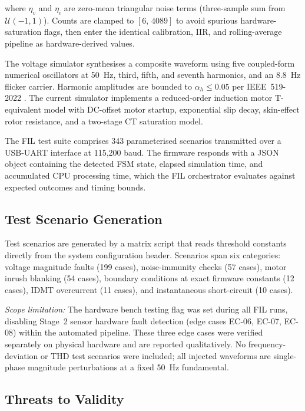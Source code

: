\documentclass[conference]{IEEEtran}
\begin{document}
\noindent
where $\eta_v$ and $\eta_i$ are zero-mean triangular noise terms
(three-sample sum from $\mathcal{U}(-1,1)$).  Counts are clamped to
$[6,\,4089]$ to avoid spurious hardware-saturation flags, then enter
the identical calibration, IIR, and rolling-average pipeline as
hardware-derived values.

The voltage simulator synthesises a composite waveform using five
coupled-form numerical oscillators \cite{oppenheim_dsp} at \SI{50}{\hertz}, third, fifth,
and seventh harmonics, and an \SI{8.8}{\hertz} flicker carrier.
Harmonic amplitudes are bounded to $\alpha_h \leq 0.05$ per
IEEE~519-2022 \cite{ieee519}.  The current simulator implements a
reduced-order induction motor T-equivalent model \cite{ieee112} with
DC-offset motor startup, exponential slip decay, skin-effect rotor
resistance, and a two-stage CT saturation model.

The FIL test suite comprises 343 parameterised scenarios transmitted
over a USB-UART interface at 115{,}200 baud.  The firmware responds
with a JSON object containing the detected FSM state, elapsed
simulation time, and accumulated CPU processing time, which the FIL
orchestrator evaluates against expected outcomes and timing bounds.

\subsection{Test Scenario Generation}

Test scenarios are generated by a matrix script that reads threshold
constants directly from the system configuration header.  Scenarios
span six categories: voltage magnitude faults (199 cases),
noise-immunity checks (57 cases), motor inrush blanking (54 cases),
boundary conditions at exact firmware constants (12 cases), IDMT
overcurrent (11 cases), and instantaneous short-circuit (10 cases).

\textit{Scope limitation:}  The hardware bench testing flag was set
during all FIL runs, disabling Stage~2 sensor hardware fault detection
(edge cases EC-06, EC-07, EC-08) within the automated pipeline.  These
three edge cases were verified separately on physical hardware and are
reported qualitatively.  No frequency-deviation or THD test scenarios
were included; all injected waveforms are single-phase magnitude
perturbations at a fixed \SI{50}{\hertz} fundamental.

\subsection{Threats to Validity}
\label{sec:threats}
\end{document}
